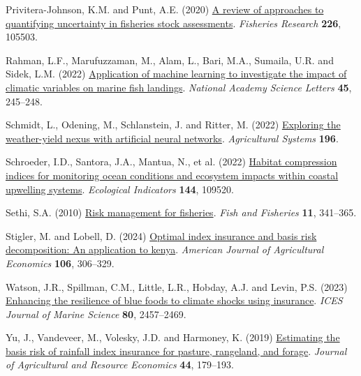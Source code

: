 \documentclass[
  letterpaper,
  DIV=11,
  numbers=noendperiod]{scrartcl}
\newlength{\cslhangindent}
\newlength{\cslentryspacingunit} %
\newenvironment{CSLReferences}[2] %
 {%
  \setlength{\parindent}{0pt}
  \ifodd #1
  \let\oldpar\par
  \def\par{\hangindent=\cslhangindent\oldpar}
  \fi
  \setlength{\parskip}{#2\cslentryspacingunit}
 }%
 {}
\begin{document}
\begin{CSLReferences}{1}{0}
\leavevmode{}%
Privitera-Johnson, K.M. and Punt, A.E. (2020)
\href{https://doi.org/10.1016/j.fishres.2020.105503}{A review of
approaches to quantifying uncertainty in fisheries stock assessments}.
\emph{Fisheries Research} \textbf{226}, 105503.

\leavevmode{}%
Rahman, L.F., Marufuzzaman, M., Alam, L., Bari, M.A., Sumaila, U.R. and
Sidek, L.M. (2022)
\href{https://doi.org/10.1007/s40009-022-01110-0}{Application of machine
learning to investigate the impact of climatic variables on marine fish
landings}. \emph{National Academy Science Letters} \textbf{45},
245--248.

\leavevmode{}%
Schmidt, L., Odening, M., Schlanstein, J. and Ritter, M. (2022)
\href{https://doi.org/10.1016/J.AGSY.2021.103345}{Exploring the
weather-yield nexus with artificial neural networks}. \emph{Agricultural
Systems} \textbf{196}.

\leavevmode{}%
Schroeder, I.D., Santora, J.A., Mantua, N., et al. (2022)
\href{https://doi.org/10.1016/j.ecolind.2022.109520}{Habitat compression
indices for monitoring ocean conditions and ecosystem impacts within
coastal upwelling systems}. \emph{Ecological Indicators} \textbf{144},
109520.

\leavevmode{}%
Sethi, S.A. (2010)
\href{https://doi.org/10.1111/j.1467-2979.2010.00363.x}{Risk management
for fisheries}. \emph{Fish and Fisheries} \textbf{11}, 341--365.

\leavevmode{}%
Stigler, M. and Lobell, D. (2024)
\href{https://doi.org/10.1111/ajae.12375}{Optimal index insurance and
basis risk decomposition: An application to kenya}. \emph{American
Journal of Agricultural Economics} \textbf{106}, 306--329.

\leavevmode{}%
Watson, J.R., Spillman, C.M., Little, L.R., Hobday, A.J. and Levin, P.S.
(2023) \href{https://doi.org/10.1093/icesjms/fsad175}{Enhancing the
resilience of blue foods to climate shocks using insurance}. \emph{ICES
Journal of Marine Science} \textbf{80}, 2457--2469.

\leavevmode{}%
Yu, J., Vandeveer, M., Volesky, J.D. and Harmoney, K. (2019)
\href{https://doi.org/10.22004/ag.econ.281319}{Estimating the basis risk
of rainfall index insurance for pasture, rangeland, and forage}.
\emph{Journal of Agricultural and Resource Economics} \textbf{44},
179--193.

\end{CSLReferences}
\end{document}
